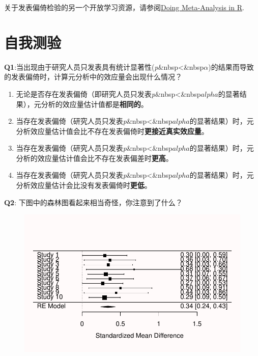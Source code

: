 \documentclass[
  letterpaper,
  DIV=11,
  numbers=noendperiod]{scrreprt}
\providecommand{\tightlist}{%
  \setlength{\itemsep}{0pt}\setlength{\parskip}{0pt}}\usepackage{longtable,booktabs,array}
\begin{document}
关于发表偏倚检验的另一个开放学习资源，请参阅\href{https://bookdown.org/MathiasHarrer/Doing_Meta_Analysis_in_R/pub-bias.html}{Doing
Meta-Analysis in R}.

\hypertarget{ux81eaux6211ux6d4bux9a8c-1}{%
\section{自我测验}\label{ux81eaux6211ux6d4bux9a8c-1}}

\textbf{Q1}:当出现由于研究人员只发表具有统计显著性(\emph{p}\&nbsp\textless\&nbsp\(\alpha\))的结果而导致的发表偏倚时，计算元分析中的效应量会出现什么情况？

\begin{enumerate}
\def\labelenumi{\Alph{enumi})}
\tightlist
\item
  无论是否存在发表偏倚（即研究人员只发表\emph{p}\&nbsp\textless\&nbsp\(alpha\)的显著结果），元分析的效应量估计值都是\textbf{相同的}。
\item
  当存在发表偏倚（研究人员只发表\emph{p}\&nbsp\textless\&nbsp\(alpha\)的显著结果）时，元分析效应量估计值会比不存在发表偏倚时\textbf{更接近真实效应量}。
\item
  当存在发表偏倚（研究人员只发表\emph{p}\&nbsp\textless\&nbsp\(alpha\)的显著结果）时，元分析的效应量估计值会比不存在发表偏差时\textbf{更高}。
\item
  当存在发表偏倚（研究人员只发表\emph{p}\&nbsp\textless\&nbsp\(alpha\)的显著结果）时，元分析效应量估计会比没有发表偏倚时\textbf{更低}。
\end{enumerate}

\textbf{Q2}: 下图中的森林图看起来相当奇怪，你注意到了什么？

\begin{figure}

{\centering \includegraphics[width=1\textwidth,height=\textheight]{12-bias_files/figure-pdf/metasimq2-1.pdf}

}

\end{figure}
\end{document}
